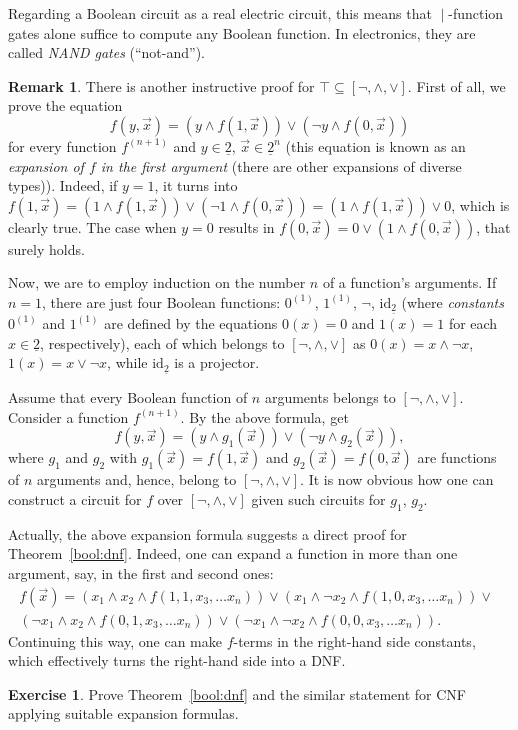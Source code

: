\documentclass[12pt,notitlepage]{article}
\theoremstyle{plain}
\theoremstyle{definition}
\newtheorem{exc}[thm]{Exercise}
\newtheorem{rem}[thm]{Remark}
\theoremstyle{plain}
\newcommand{\sbs}{\subseteq}
\newcommand{\id}{\mathrm{id}}
\newcommand{\ul}[1]{\underline{#1}}
\newcommand{\1}{\mathbf{1}}
\newcommand{\0}{\mathbf{0}}
\newcommand{\dvd}{\mathop{\mid}}
\begin{document}
Regarding a Boolean circuit as a real electric circuit, this means that ${\dvd}$-function gates alone suffice to compute any Boolean function. In electronics, they are called \emph{NAND gates} (``not-and'').

\begin{rem}\label{bool:func_var}
There is another instructive proof for $\top \sbs [{\neg}, {\wedge}, {\vee}]$. First of all, we prove the equation
$$f(y, \vec x) = (y \wedge f(1, \vec x)) \vee (\neg y \wedge f(0, \vec x))$$
for every function $f^{(n+1)}$ and $y \in \ul{2}$, $\vec{x} \in \ul{2}^{n}$ (this equation is known as an \emph{expansion of $f$ in the first argument} (there are other expansions of diverse types)). Indeed, if $y = 1$, it turns into $f(1, \vec x) = (1 \wedge f(1, \vec x)) \vee (\neg 1 \wedge f(0, \vec x)) = (1 \wedge f(1, \vec x)) \vee 0$, which is clearly true. The case when $y = 0$ results in $f(0, \vec x) = 0 \vee (1 \wedge f(0, \vec x))$, that surely holds.

Now, we are to employ induction on the number $n$ of a function's arguments. If $n = 1$, there are just four Boolean functions: $0^{(1)}$, $1^{(1)}$, $\neg$, $\id_{\ul{2}}$ (where \emph{constants} $0^{(1)}$ and $1^{(1)}$ are defined by the equations $0(x) = 0$ and $1(x) = 1$ for each $x \in \ul{2}$, respectively), each of which belongs to $[{\neg}, {\wedge}, {\vee}]$ as $0(x) = x \wedge \neg x$, $1(x) = x \vee \neg x$, while $\id_{\ul{2}}$ is a projector.

Assume that every Boolean function of $n$ arguments belongs to $[{\neg}, {\wedge}, {\vee}]$. Consider a function $f^{(n+1)}$. By the above formula, get
$$f(y, \vec x) = (y \wedge g_1(\vec x)) \vee (\neg y \wedge g_2(\vec x)),$$
where $g_1$ and $g_2$ with $g_1(\vec x) = f(1, \vec x)$ and $g_2(\vec x) = f(0, \vec x)$ are functions of $n$ arguments and, hence, belong to $[{\neg}, {\wedge}, {\vee}]$. It is now obvious how one can construct a circuit for $f$ over $[{\neg}, {\wedge}, {\vee}]$ given such circuits for $g_1$, $g_2$.

Actually, the above  expansion formula suggests a direct proof for Theorem~\ref{bool:dnf}. Indeed, one can expand a function in more than one argument, say, in the first and second ones:
\begin{multline*}
f(\vec x) = (x_1 \wedge x_2 \wedge f(1, 1, x_3, \ldots x_n)) \vee (x_1 \wedge \neg x_2 \wedge f(1, 0, x_3, \ldots x_n)) \vee\phantom{y}\\
 (\neg x_1 \wedge x_2 \wedge f(0, 1, x_3, \ldots x_n)) \vee (\neg x_1 \wedge \neg x_2 \wedge f(0, 0, x_3, \ldots x_n)).
\end{multline*}
Continuing this way, one can make $f$-terms in the right-hand side constants, which effectively turns the right-hand side into a DNF.
\end{rem}
\begin{exc}
Prove Theorem~\ref{bool:dnf} and the similar statement for CNF applying suitable expansion formulas.
\end{exc}
\end{document}
